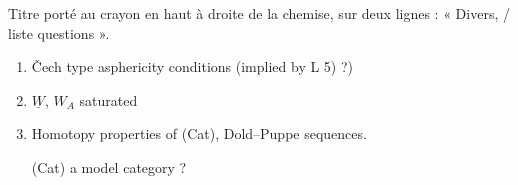 \documentclass[11pt,a4paper]{article}
\begin{document}
Titre porté au crayon en haut à droite de la chemise, sur deux lignes :
« Divers, / liste questions ».


\begin{enumerate}
\item Čech type asphericity conditions (implied by L 5) ?)

\item $\underline{W}$, $W_{A}$ saturated

\item Homotopy properties of (Cat), Dold--Puppe sequences. 

(Cat) a model category ?
\end{enumerate}

\end{document}
